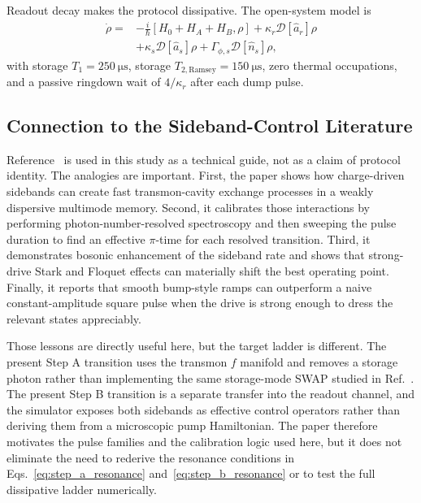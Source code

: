 \documentclass[aps,pra,twocolumn,reprint,floatfix,amsmath,amssymb]{revtex4-2}
\begin{document}
Readout decay makes the protocol dissipative. The open-system model is
\begin{equation}
\begin{split}
\dot{\rho}={}&
-\frac{i}{\hbar}[H_0+H_A+H_B,\rho]
+ \kappa_r \mathcal{D}[\hat{a}_r]\rho \\
&+ \kappa_s \mathcal{D}[\hat{a}_s]\rho
+ \Gamma_{\phi,s}\mathcal{D}[\hat{n}_s]\rho,
\end{split}
\label{eq:lindblad}
\end{equation}
with storage \(T_1=\SI{250}{\micro\second}\), storage \(T_{2,\mathrm{Ramsey}}=\SI{150}{\micro\second}\), zero thermal occupations, and a passive ringdown wait of \(4/\kappa_r\) after each dump pulse.

\subsection{Connection to the Sideband-Control Literature}
Reference~ is used in this study as a technical guide, not as a claim of protocol identity. The analogies are important. First, the paper shows how charge-driven sidebands can create fast transmon-cavity exchange processes in a weakly dispersive multimode memory. Second, it calibrates those interactions by performing photon-number-resolved spectroscopy and then sweeping the pulse duration to find an effective \(\pi\)-time for each resolved transition. Third, it demonstrates bosonic enhancement of the sideband rate and shows that strong-drive Stark and Floquet effects can materially shift the best operating point. Finally, it reports that smooth bump-style ramps can outperform a naive constant-amplitude square pulse when the drive is strong enough to dress the relevant states appreciably.

Those lessons are directly useful here, but the target ladder is different. The present Step A transition uses the transmon \(f\) manifold and removes a storage photon rather than implementing the same storage-mode SWAP studied in Ref.~. The present Step B transition is a separate transfer into the readout channel, and the simulator exposes both sidebands as effective control operators rather than deriving them from a microscopic pump Hamiltonian. The paper therefore motivates the pulse families and the calibration logic used here, but it does not eliminate the need to rederive the resonance conditions in Eqs.~\eqref{eq:step_a_resonance} and~\eqref{eq:step_b_resonance} or to test the full dissipative ladder numerically.
\end{document}
